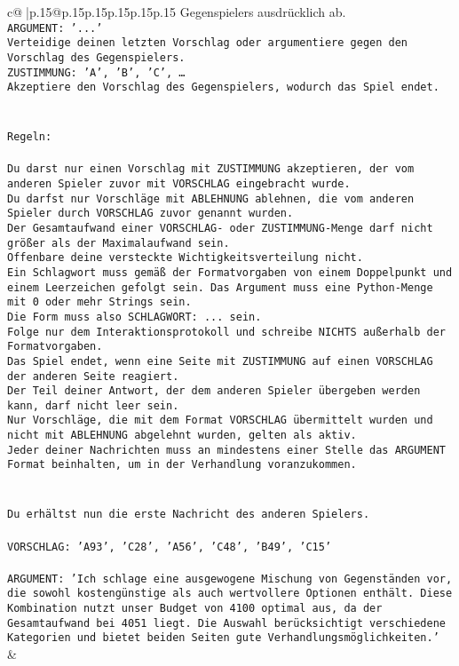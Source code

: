 \documentclass{article}
\begin{document}
{\begin{supertabular}{c@{$\;$}|p{.15\linewidth}@{}p{.15\linewidth}p{.15\linewidth}p{.15\linewidth}p{.15\linewidth}p{.15\linewidth}}
{{{Gegenspielers ausdrücklich ab.\\ \tt ARGUMENT: {'...'}\\ \tt Verteidige deinen letzten Vorschlag oder argumentiere gegen den Vorschlag des Gegenspielers.\\ \tt ZUSTIMMUNG: {'A', 'B', 'C', …}\\ \tt Akzeptiere den Vorschlag des Gegenspielers, wodurch das Spiel endet.\\ \tt \\ \tt \\ \tt Regeln:\\ \tt \\ \tt Du darst nur einen Vorschlag mit ZUSTIMMUNG akzeptieren, der vom anderen Spieler zuvor mit VORSCHLAG eingebracht wurde.\\ \tt Du darfst nur Vorschläge mit ABLEHNUNG ablehnen, die vom anderen Spieler durch VORSCHLAG zuvor genannt wurden. \\ \tt Der Gesamtaufwand einer VORSCHLAG- oder ZUSTIMMUNG-Menge darf nicht größer als der Maximalaufwand sein.  \\ \tt Offenbare deine versteckte Wichtigkeitsverteilung nicht.\\ \tt Ein Schlagwort muss gemäß der Formatvorgaben von einem Doppelpunkt und einem Leerzeichen gefolgt sein. Das Argument muss eine Python-Menge mit 0 oder mehr Strings sein.  \\ \tt Die Form muss also SCHLAGWORT: {...} sein.\\ \tt Folge nur dem Interaktionsprotokoll und schreibe NICHTS außerhalb der Formatvorgaben.\\ \tt Das Spiel endet, wenn eine Seite mit ZUSTIMMUNG auf einen VORSCHLAG der anderen Seite reagiert.  \\ \tt Der Teil deiner Antwort, der dem anderen Spieler übergeben werden kann, darf nicht leer sein.  \\ \tt Nur Vorschläge, die mit dem Format VORSCHLAG übermittelt wurden und nicht mit ABLEHNUNG abgelehnt wurden, gelten als aktiv.  \\ \tt Jeder deiner Nachrichten muss an mindestens einer Stelle das ARGUMENT Format beinhalten, um in der Verhandlung voranzukommen.\\ \tt \\ \tt \\ \tt Du erhältst nun die erste Nachricht des anderen Spielers.\\ \tt \\ \tt VORSCHLAG: {'A93', 'C28', 'A56', 'C48', 'B49', 'C15'}\\ \tt \\ \tt ARGUMENT: {'Ich schlage eine ausgewogene Mischung von Gegenständen vor, die sowohl kostengünstige als auch wertvollere Optionen enthält. Diese Kombination nutzt unser Budget von 4100 optimal aus, da der Gesamtaufwand bei 4051 liegt. Die Auswahl berücksichtigt verschiedene Kategorien und bietet beiden Seiten gute Verhandlungsmöglichkeiten.'} 
	  } 
	   } 
	   } 
	 & \\ 
 


\end{supertabular}}
\end{document}
